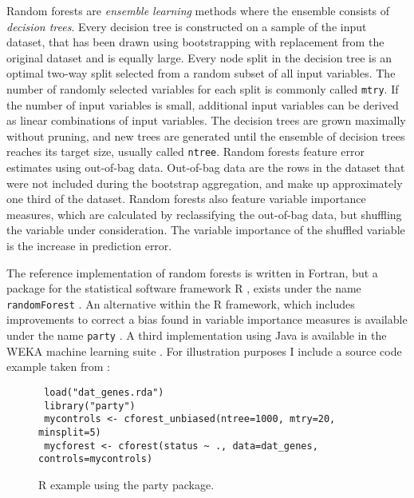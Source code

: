 \documentclass[a4paper,man,12pt,apacite,floatsintext]{apa6} %
\begin{document}
Random forests are \emph{ensemble learning} methods where the ensemble consists
of \emph{decision trees}.
Every decision tree is constructed on a sample of the input dataset,
that has been drawn using bootstrapping with replacement from the original
dataset and is equally large.
Every node split in the decision tree is an optimal two-way split selected
from a random subset of all input variables.
The number of randomly selected variables for each split is commonly called
\texttt{mtry}.
If the number of input variables is small, additional input variables can be
derived as linear combinations of input variables.
The decision trees are grown maximally without pruning,
and new trees are generated until the ensemble of decision trees reaches its
target size, usually called \texttt{ntree}.
Random forests feature error estimates using out-of-bag data.
Out-of-bag data are the rows in the dataset that were not included during
the bootstrap aggregation, and make up approximately one third of the dataset.
Random forests also feature variable importance measures,
which are calculated by reclassifying the out-of-bag data,
but shuffling the variable under consideration.
The variable importance of the shuffled variable is the increase in
prediction error.

The reference implementation of random forests is written in Fortran,
but a package for the statistical software framework R \cite{rproject2012},
exists under the name \texttt{randomForest} \cite{liaw2002classification}.
An alternative within the R framework, which includes improvements
to correct a bias found in variable
importance measures is available under the name \texttt{party}
\cite{strobl2008conditional}.
A third implementation using Java is available in the WEKA machine learning
suite \cite{hall2009weka}.
For illustration purposes I include a source code example taken from
:

\begin{figure}[H]
\caption{R example using the party package.}
\begin{verbatim}
 load("dat_genes.rda")
 library("party")
 mycontrols <- cforest_unbiased(ntree=1000, mtry=20, minsplit=5)
 mycforest <- cforest(status ~ ., data=dat_genes, controls=mycontrols)
\end{verbatim}
\end{figure}
\end{document}
